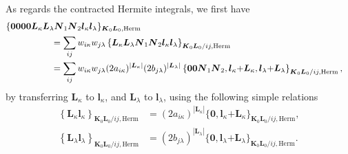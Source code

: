 \documentclass[a4paper,11pt,twoside,openright]{book}
\begin{document}
As regards the contracted Hermite integrals, we first have
\begin{align}
  \label{eq:nonlao-aux-int-herm}
  \{\boldsymbol{0000}%
    \boldsymbol{L}_{\kappa}\boldsymbol{L}_{\lambda}\boldsymbol{N}_{1}\boldsymbol{N}_{2}%
    \boldsymbol{l}_{\kappa}\boldsymbol{l}_{\lambda}\}_{\boldsymbol{K}_{0}\boldsymbol{L}_{0},\text{Herm}}\hspace{-10em}\\
  &=\sum_{ij}w_{i\kappa}w_{j\lambda}%
    \left\{\boldsymbol{L}_{\kappa}\boldsymbol{L}_{\lambda}\boldsymbol{N}_{1}\boldsymbol{N}_{2}
      \boldsymbol{l}_{\kappa}\boldsymbol{l}_{\lambda}\right\}_{\boldsymbol{K}_{0}\boldsymbol{L}_{0}/ij,\text{Herm}}\nonumber\\
  &=\sum_{ij}w_{i\kappa}w_{j\lambda}%
    (2a_{i\kappa})^{|\boldsymbol{L}_{\kappa}|}%
    (2b_{j\lambda})^{|\boldsymbol{L}_{\lambda}|}%
    \left\{\boldsymbol{00}\boldsymbol{N}_{1}\boldsymbol{N}_{2},%
      \boldsymbol{l}_{\kappa}\mathrm{+}\boldsymbol{L}_{\kappa},%
      \boldsymbol{l}_{\lambda}\mathrm{+}\boldsymbol{L}_{\lambda}\right\}_{\boldsymbol{K}_{0}\boldsymbol{L}_{0}/ij,\text{Herm}},\nonumber
\end{align}
by transferring $\boldsymbol{L}_{\kappa}$ to $\boldsymbol{l}_{\kappa}$,
and $\boldsymbol{L}_{\lambda}$ to $\boldsymbol{l}_{\lambda}$, using the following
simple relations~\cite{bgkrth-a,bgkr}
\begin{align}
  \left\{\boldsymbol{L}_{\kappa}\boldsymbol{l}_{\kappa}\right\}_{\boldsymbol{K}_{0}\boldsymbol{L}_{0}/ij,\text{Herm}}
  \label{eq:recurrence-geo-herm-bra}
  &=(2a_{i\kappa})^{|\boldsymbol{L}_{\kappa}|}%
    \{\boldsymbol{0},\boldsymbol{l}_{\kappa}\mathrm{+}\boldsymbol{L}_{\kappa}\}_{\boldsymbol{K}_{0}\boldsymbol{L}_{0}/ij,\text{Herm}},\\
%
  \left\{\boldsymbol{L}_{\lambda}\boldsymbol{l}_{\lambda}\right\}_{\boldsymbol{K}_{0}\boldsymbol{L}_{0}/ij,\text{Herm}}
  \label{eq:recurrence-geo-herm-ket}
  &=(2b_{j\lambda})^{|\boldsymbol{L}_{\lambda}|}%
    \{\boldsymbol{0},\boldsymbol{l}_{\lambda}\mathrm{+}\boldsymbol{L}_{\lambda}\}_{\boldsymbol{K}_{0}\boldsymbol{L}_{0}/ij,\text{Herm}}.
\end{align}
\end{document}
